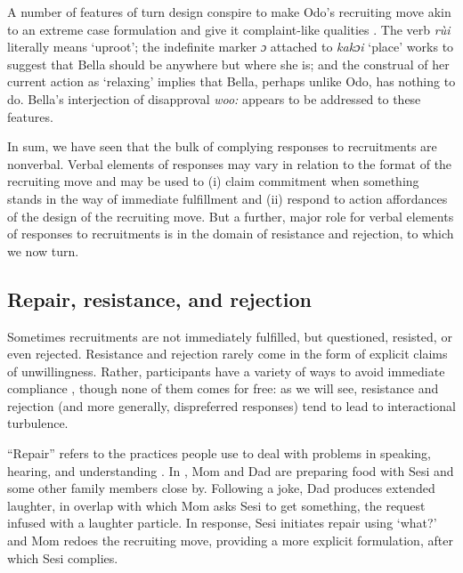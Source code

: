 \documentclass[output=paper]{langsci/langscibook}
\begin{document}
\normalsize
A number of features of turn design conspire to make Odo’s recruiting move akin to an extreme case formulation and give it complaint-like qualities \citep{pomerantz_extreme_1986}. The verb \textit{rùi} literally means ‘uproot’; the indefinite marker \textit{ɔ} attached to \textit{kakɔi} ‘place’ works to suggest that Bella should be anywhere but where she is; and the construal of her current action as ‘relaxing’ implies that Bella, perhaps unlike Odo, has nothing to do. Bella’s interjection of disapproval \textit{woo:} appears to be addressed to these features.

In sum, we have seen that the bulk of complying responses to recruitments are nonverbal. Verbal elements of responses may vary in relation to the format of the recruiting move and may be used to (i) claim commitment when something stands in the way of immediate fulfillment and (ii) respond to action affordances of the design of the recruiting move. But a further, major role for verbal elements of responses to recruitments is in the domain of resistance and rejection, to which we now turn.

\subsection{Repair, resistance, and rejection}\label{sec:dingemanse:4.2}

Sometimes recruitments are not immediately fulfilled, but questioned, resisted, or even rejected. Resistance and rejection rarely come in the form of explicit claims of unwillingness. Rather, participants have a variety of ways to avoid immediate compliance \citep{kent_compliance_2012}, though none of them comes for free: as we will see, resistance and rejection (and more generally, dispreferred responses) tend to lead to interactional turbulence.

“Repair” refers to the practices people use to deal with problems in speaking, hearing, and understanding \citep{schegloff_preference_1977}. In , Mom and Dad are preparing food with Sesi and some other family members close by. Following a joke, Dad produces extended laughter, in overlap with which Mom asks Sesi to get something, the request infused with a laughter particle. In response, Sesi initiates repair using ‘what?’ and Mom redoes the recruiting move, providing a more explicit formulation, after which Sesi complies.
\end{document}
